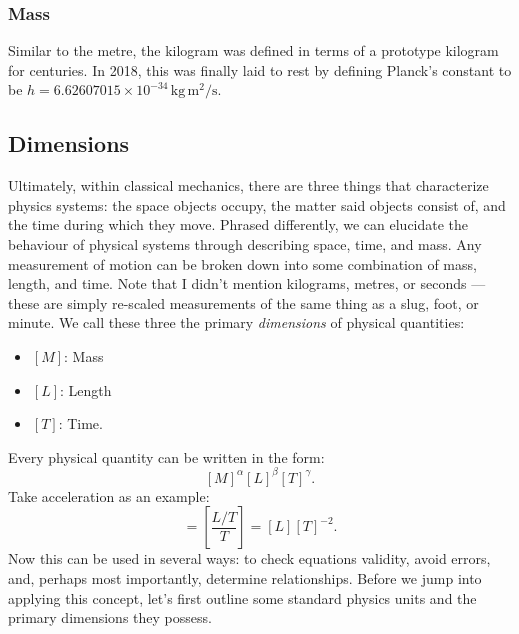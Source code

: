 \documentclass[letterpaper,12pt]{article}
\begin{document}
\subsubsection{Mass}\label{sec:mass}

Similar to the metre, the kilogram was defined in terms of a prototype kilogram for centuries. In 2018, this was finally laid to rest by defining Planck's constant to be $h = 6.626 070 15 \times 10^{-34}\,\mathrm{kg}\,\mathrm{m^2}/\mathrm{s}$.

\subsection{Dimensions}\label{sec:dimensions}

Ultimately, within classical mechanics, there are three things that characterize physics systems: the space objects occupy, the matter said objects consist of, and the time during which they move. Phrased differently, we can elucidate the behaviour of physical systems through describing space, time, and mass. Any measurement of motion can be broken down into some combination of mass, length, and time. Note that I didn't mention kilograms, metres, or seconds --- these are simply re-scaled measurements of the same thing as a slug, foot, or minute. We call these three the primary \textit{dimensions} of physical quantities:
\begin{itemize}
\item $[M]$: Mass
\item $[L]$: Length
\item $[T]$: Time.
\end{itemize} 
Every physical quantity can be written in the form:
\begin{equation}\label{eqn:dimension}
[M]^\alpha [L]^\beta [T]^\gamma.
\end{equation} 
Take acceleration as an example:
\begin{equation}
[a] = \left[\frac{L/T}{T}\right]=[L][T]^{-2}.
\end{equation}
Now this can be used in several ways: to check equations validity, avoid errors, and, perhaps most importantly, determine relationships. Before we jump into applying this concept, let's first outline some standard physics units and the primary dimensions they possess.
\end{document}
